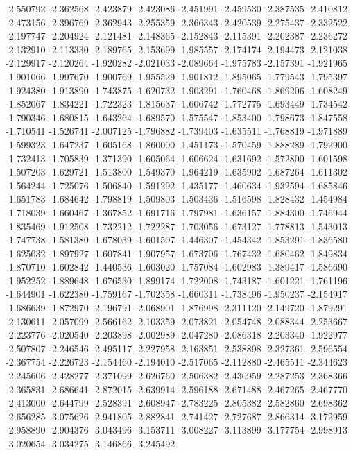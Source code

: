 -2.550792
-2.362568
-2.423879
-2.423086
-2.451991
-2.459530
-2.387535
-2.410812
-2.473156
-2.396769
-2.362943
-2.255359
-2.366343
-2.420539
-2.275437
-2.332522
-2.197747
-2.204924
-2.121481
-2.148365
-2.152843
-2.115391
-2.202387
-2.236272
-2.132910
-2.113330
-2.189765
-2.153699
-1.985557
-2.174174
-2.194473
-2.121038
-2.129917
-2.120264
-1.920282
-2.021033
-2.089664
-1.975783
-2.157391
-1.921965
-1.901066
-1.997670
-1.900769
-1.955529
-1.901812
-1.895065
-1.779543
-1.795397
-1.924380
-1.913890
-1.743875
-1.620732
-1.903291
-1.760468
-1.869206
-1.608249
-1.852067
-1.834221
-1.722323
-1.815637
-1.606742
-1.772775
-1.693449
-1.734542
-1.790346
-1.680815
-1.643264
-1.689570
-1.575547
-1.853400
-1.798673
-1.847558
-1.710541
-1.526741
-2.007125
-1.796882
-1.739403
-1.635511
-1.768819
-1.971889
-1.599323
-1.647237
-1.605168
-1.860000
-1.451173
-1.570459
-1.888289
-1.792900
-1.732413
-1.705839
-1.371390
-1.605064
-1.606624
-1.631692
-1.572800
-1.601598
-1.507203
-1.629721
-1.513800
-1.549370
-1.964219
-1.635902
-1.687264
-1.611302
-1.564244
-1.725076
-1.506840
-1.591292
-1.435177
-1.460634
-1.932594
-1.685846
-1.651783
-1.684642
-1.798819
-1.509803
-1.503436
-1.516598
-1.828432
-1.454984
-1.718039
-1.660467
-1.367852
-1.691716
-1.797981
-1.636157
-1.884300
-1.746944
-1.835469
-1.912508
-1.732212
-1.722287
-1.703056
-1.673127
-1.778813
-1.543013
-1.747738
-1.581380
-1.678039
-1.601507
-1.446307
-1.454342
-1.853291
-1.836580
-1.625032
-1.897927
-1.607841
-1.907957
-1.673706
-1.767432
-1.680462
-1.849834
-1.870710
-1.602842
-1.440536
-1.603020
-1.757084
-1.602983
-1.389417
-1.586690
-1.952252
-1.889648
-1.676530
-1.899174
-1.722008
-1.743187
-1.601221
-1.761196
-1.644901
-1.622380
-1.759167
-1.702358
-1.660311
-1.738496
-1.950237
-2.154917
-1.686639
-1.872970
-2.196791
-2.068901
-1.876998
-2.311120
-2.149720
-1.879291
-2.130611
-2.057099
-2.566162
-2.103359
-2.073821
-2.054748
-2.088344
-2.253667
-2.223776
-2.020540
-2.203898
-2.002989
-2.047280
-2.086318
-2.203340
-1.922977
-2.507807
-2.246546
-2.495117
-2.227958
-2.163851
-2.538898
-2.327361
-2.596554
-2.367754
-2.226723
-2.154460
-2.194010
-2.517065
-2.112880
-2.465511
-2.344623
-2.245606
-2.428277
-2.371099
-2.626760
-2.506382
-2.430959
-2.287253
-2.368366
-2.365831
-2.686641
-2.872015
-2.639914
-2.596188
-2.671488
-2.467265
-2.467770
-2.413000
-2.644799
-2.528391
-2.608947
-2.783225
-2.805382
-2.582860
-2.698362
-2.656285
-3.075626
-2.941805
-2.882841
-2.741427
-2.727687
-2.866314
-3.172959
-2.958890
-2.904376
-3.043496
-3.153711
-3.008227
-3.113899
-3.177754
-2.998913
-3.020654
-3.034275
-3.146866
-3.245492
